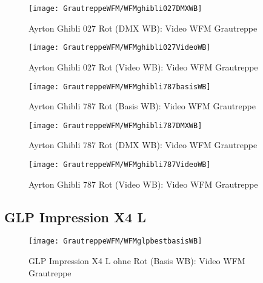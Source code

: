 \documentclass[pagesize,paper=A4,fontsize=12pt,utf8,numbers=noenddot,bibliography=totoc,listof=totoc,DIV=11,BCOR=1mm]{scrreprt}
\begin{document}
\begin{figure}[htp]     %
\centering
\texttt{[image: GrautreppeWFM/WFMghibli027DMXWB]} 
\caption {Ayrton Ghibli 027 Rot (DMX WB): Video WFM Grautreppe} 
\end{figure}

\begin{figure}[htp]     %
\centering
\texttt{[image: GrautreppeWFM/WFMghibli027VideoWB]} 
\caption {Ayrton Ghibli 027 Rot (Video WB): Video WFM Grautreppe} 
\end{figure}



\begin{figure}[htp]     %
\centering
\texttt{[image: GrautreppeWFM/WFMghibli787basisWB]} 
\caption {Ayrton Ghibli 787 Rot (Basis WB): Video WFM Grautreppe} 
\end{figure}

\begin{figure}[htp]     %
\centering
\texttt{[image: GrautreppeWFM/WFMghibli787DMXWB]} 
\caption {Ayrton Ghibli 787 Rot (DMX WB): Video WFM Grautreppe} 
\end{figure}

\begin{figure}[htp]     %
\centering
\texttt{[image: GrautreppeWFM/WFMghibli787VideoWB]} 
\caption {Ayrton Ghibli 787 Rot (Video WB): Video WFM Grautreppe} 
\end{figure}



\subsection{GLP Impression X4 L}

\begin{figure}[htp]     %
\centering
\texttt{[image: GrautreppeWFM/WFMglpbestbasisWB]} 
\caption {GLP Impression X4 L ohne Rot (Basis WB): Video WFM Grautreppe} 
\end{figure}
\end{document}
